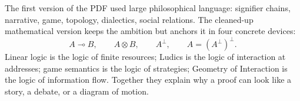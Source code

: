 The first version of the PDF used large philosophical language: signifier chains, narrative, game, topology, dialectics, social relations.  The cleaned-up mathematical version keeps the ambition but anchors it in four concrete devices:
\[
  A\multimap B,
  \qquad
  A\otimes B,
  \qquad
  A^\perp,
  \qquad
  A=(A^\perp)^\perp.
\]
Linear logic is the logic of finite resources; Ludics is the logic of interaction at addresses; game semantics is the logic of strategies; Geometry of Interaction is the logic of information flow.  Together they explain why a proof can look like a story, a debate, or a diagram of motion.
